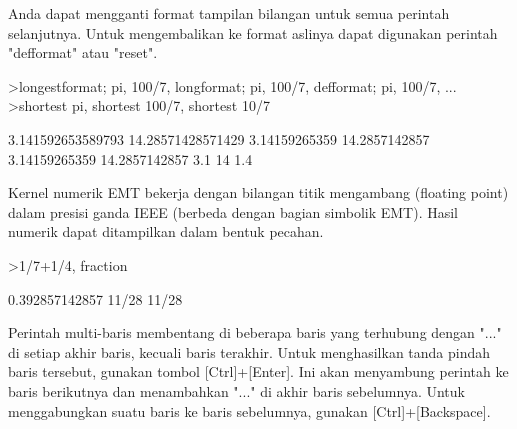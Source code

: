\documentclass[a4paper,10pt]{article}
\begin{document}
\begin{eulernotebook}
\begin{eulercomment}
Anda dapat mengganti format tampilan bilangan untuk semua perintah
selanjutnya. Untuk mengembalikan ke format aslinya dapat digunakan
perintah "defformat" atau "reset".
\end{eulercomment}
\begin{eulerprompt}
>longestformat; pi, 100/7, longformat; pi, 100/7, defformat; pi, 100/7, ...
>shortest pi, shortest 100/7, shortest 10/7
\end{eulerprompt}
\begin{euleroutput}
  3.141592653589793
  14.28571428571429
  3.14159265359
  14.2857142857
  3.14159265359
  14.2857142857
     3.1 
      14 
     1.4 
\end{euleroutput}
\begin{eulercomment}
Kernel numerik EMT bekerja dengan bilangan titik mengambang (floating
point) dalam presisi ganda IEEE (berbeda dengan bagian simbolik EMT).
Hasil numerik dapat ditampilkan dalam bentuk pecahan.
\end{eulercomment}
\begin{eulerprompt}
>1/7+1/4, fraction %
\end{eulerprompt}
\begin{euleroutput}
  0.392857142857
  11/28
  11/28
\end{euleroutput}
\begin{eulercomment}
Perintah multi-baris membentang di beberapa baris yang terhubung
dengan "..." di setiap akhir baris, kecuali baris terakhir. Untuk
menghasilkan tanda pindah baris tersebut, gunakan tombol
[Ctrl]+[Enter]. Ini akan menyambung perintah ke baris berikutnya dan
menambahkan "..." di akhir baris sebelumnya. Untuk menggabungkan suatu
baris ke baris sebelumnya, gunakan [Ctrl]+[Backspace].


\end{eulercomment}
\end{eulernotebook}
\end{document}
